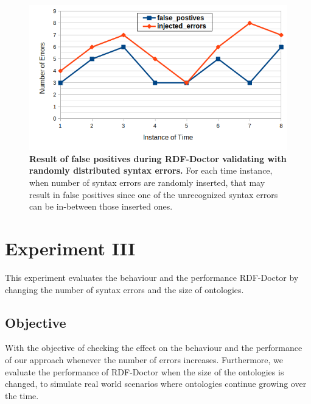 \begin{figure}[ht]
	\begin{center}
		\includegraphics[scale=0.7,angle=0]{images/Experiment02-03.png}
				\setlength\belowcaptionskip{-5mm}
		\caption{\textbf{Result of false positives during RDF-Doctor validating with randomly distributed syntax errors.} 
		For each time instance, when number of syntax errors are randomly inserted, that may result in false positives since one of the unrecognized syntax errors can be in-between those inserted ones.} 
		\label{Fig:Experiment02-03}
				\setlength\belowcaptionskip{-5mm}
		\setlength\abovecaptionskip{0mm}
	\end{center}
\end{figure}
 


\section{Experiment III}

This experiment evaluates the behaviour and the performance RDF-Doctor by changing the number of syntax errors and the size of ontologies. 

\subsection{Objective}
With the objective of checking the effect on the behaviour and the performance of our approach whenever the number of errors increases.
Furthermore, we evaluate the performance of RDF-Doctor when the size of the ontologies is changed, to simulate real world scenarios where ontologies continue growing over the time.



